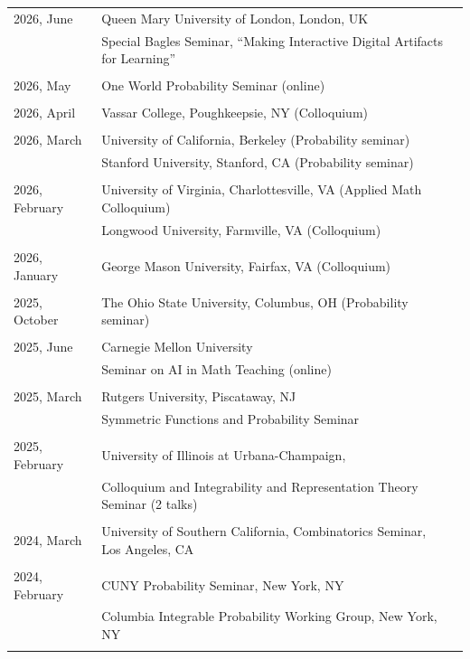 \documentclass[letterpaper,11pt]{article}
\begin{document}
\begin{longtable}{llc}
		2026, June
		& Queen Mary University of London, London, UK\\
		& Special Bagles Seminar, ``Making Interactive Digital Artifacts for Learning''
		\\\\
		2026, May
		& One World Probability Seminar (online)
		\\\\
		2026, April
		& Vassar College, Poughkeepsie, NY (Colloquium)
		\\\\
		2026, March
		& University of California, Berkeley (Probability seminar)
		\\
		& Stanford University, Stanford, CA (Probability seminar)
		\\\\
		2026, February
		& University of Virginia, Charlottesville, VA (Applied Math Colloquium)
		\\
		& Longwood University, Farmville, VA (Colloquium)
		\\\\
		2026, January
		& George Mason University, Fairfax, VA (Colloquium)
		\\\\
		2025, October
		& The Ohio State University, Columbus, OH (Probability seminar)
		\\\\
		2025, June
		& Carnegie Mellon University\\ & Seminar on AI in Math Teaching (online)
		\\\\
		2025, March
		& Rutgers University, Piscataway, NJ
		\\
		& Symmetric Functions and Probability Seminar
    \\\\
    2025, February
    & University of Illinois at Urbana-Champaign,
    \\
    &
    Colloquium and Integrability and Representation Theory Seminar (2 talks)
    \\\\
    2024, March
    & University of Southern California,
    Combinatorics Seminar, Los Angeles, CA
    \\\\
	2024, February
	& CUNY Probability Seminar, New York, NY
	\\
	& Columbia Integrable Probability Working Group, New York, NY
	\\\\

\end{longtable}
\end{document}
